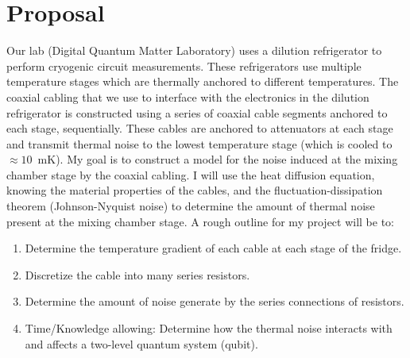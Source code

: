 \documentclass{article}
\begin{document}
\section{Proposal}
\label{sec:proposal}

Our lab (Digital Quantum Matter Laboratory) uses a dilution refrigerator to
perform cryogenic circuit measurements. These refrigerators use multiple
temperature stages which are thermally anchored to different temperatures. The
coaxial cabling that we use to interface with the electronics in the dilution
refrigerator is constructed using a series of coaxial cable segments anchored to
each stage, sequentially. These cables are anchored to attenuators at each stage
and transmit thermal noise to the lowest temperature stage (which is cooled to $
\approx 10$~mK). My goal is to construct a model for the noise induced at the
mixing chamber stage by the coaxial cabling. I will use the heat diffusion
equation, knowing the material properties of the cables, and the
fluctuation-dissipation theorem (Johnson-Nyquist noise) to determine the amount
of thermal noise present at the mixing chamber stage. A rough outline for my
project will be to:
\begin{enumerate}
   \item Determine the temperature gradient of each cable at each stage of the
      fridge.
   \item Discretize the cable into many series resistors.
   \item Determine the amount of noise generate by the series connections of
      resistors.
   \item Time/Knowledge allowing: Determine how the thermal noise interacts with
      and affects a two-level quantum system (qubit).
\end{enumerate}
\end{document}
